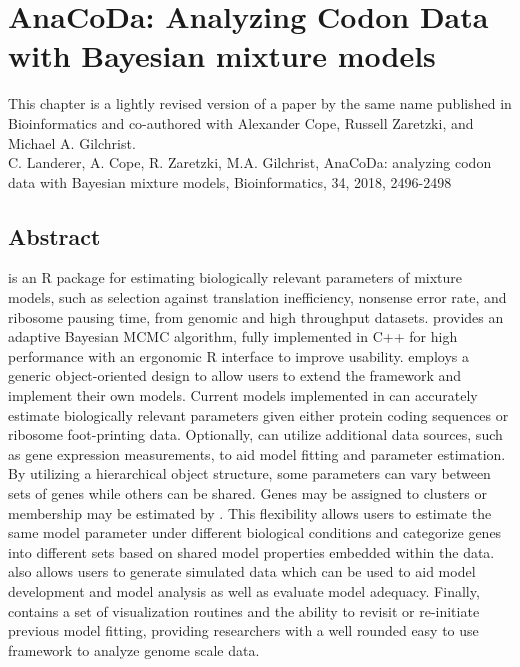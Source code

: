 \chapter{AnaCoDa: Analyzing Codon Data with Bayesian mixture models} 
\label{ch:anacoda}


\clearpage
\pagebreak
This chapter is a lightly revised version of a paper by the same name published in Bioinformatics and co-authored with Alexander Cope, Russell Zaretzki, and Michael A. Gilchrist.\\
\newline
\newline
C. Landerer, A. Cope, R. Zaretzki, M.A. Gilchrist, AnaCoDa: analyzing codon data with Bayesian mixture models, Bioinformatics, 34, 2018, 2496-2498


\section{Abstract}
\textbf{\package} is an R package for estimating biologically relevant parameters of mixture models, such as selection against translation inefficiency, nonsense error rate, and ribosome pausing time, from genomic and high throughput datasets.
\package provides an adaptive Bayesian MCMC algorithm, fully implemented in C++ for high performance with an ergonomic R interface to improve usability. 
\package employs a generic object-oriented design to allow users to extend the framework and implement their own models.
Current models implemented in \package can accurately estimate biologically relevant parameters given either protein coding sequences or ribosome foot-printing data.
Optionally, \package can utilize additional data sources, such as gene expression measurements, to aid model fitting and parameter estimation.
By utilizing a hierarchical object structure, some parameters can vary between sets of genes while others can be shared.
Genes may be assigned to clusters or membership may be estimated by \package.
This flexibility allows users to estimate the same model parameter under different biological conditions and categorize genes into different sets based on shared model properties embedded within the data.
\package also allows users to generate simulated data which can be used to aid model development and model analysis as well as evaluate model adequacy.
Finally, \package contains a set of visualization routines and the ability to revisit or re-initiate previous model fitting, providing researchers with a well rounded easy to use framework to analyze genome scale data.

